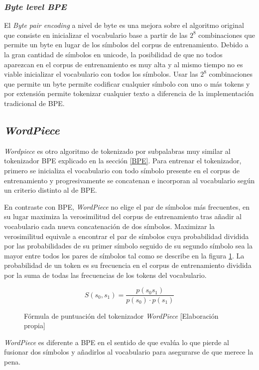 \subsubsection{\textit{Byte level BPE}}
El \textit{Byte pair encoding} a nivel de byte es una mejora sobre el algoritmo original que consiste en inicializar el vocabulario base a partir de las $2^{8}$ combinaciones que permite un byte en lugar de los símbolos del corpus de entrenamiento.
Debido a la gran cantidad de símbolos en unicode, la posibilidad de que no todos aparezcan en el corpus de entrenamiento es muy alta y al mismo tiempo no es viable inicializar el vocabulario con todos los símbolos. Usar las $2^{8}$ combinaciones que permite un byte permite codificar cualquier símbolo con uno o más tokens y por extensión permite tokenizar cualquier texto a diferencia de la implementación tradicional de BPE.

\subsection{\textit{WordPiece}}
\textit{Wordpiece} \cite{Schuster2012Mar} es otro algoritmo de tokenizado por subpalabras muy similar al tokenizador BPE explicado en la sección \ref{BPE}. Para entrenar el tokenizador, primero se inicializa el vocabulario con todo símbolo presente en el corpus de entrenamiento y progresivamente se concatenan e incorporan al vocabulario según un criterio distinto al de BPE.

En contraste con BPE, \textit{WordPiece} no elige el par de símbolos más frecuentes, en su lugar maximiza la verosimilitud del corpus de entrenamiento tras añadir al vocabulario cada nueva concatenación de dos símbolos. Maximizar la verosimilitud equivale a encontrar el par de símbolos cuya probabilidad dividida por las probabilidades de su primer símbolo seguido de su segundo símbolo sea la mayor entre todos los pares de símbolos tal como se describe en la figura \ref{wordpieceformula}. La probabilidad de un token es su frecuencia en el corpus de entrenamiento dividida por la suma de todas las frecuencias de los tokens del vocabulario.
\begin{figure}[H]
\[
    S(s_{0}, s_{1})=\frac{p(s_{0}s_{1})}{p(s_{0}) \cdot p(s_{1})}
\]
\caption{Fórmula de puntuación del tokenizador \textit{WordPiece} [Elaboración propia]}\label{wordpieceformula}
\end{figure}
\textit{WordPiece} es diferente a BPE en el sentido de que evalúa lo que pierde al fusionar dos símbolos y añadirlos al vocabulario para asegurarse de que merece la pena.

